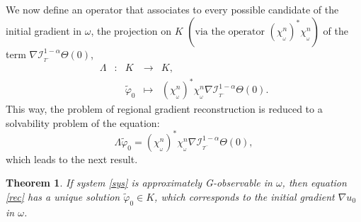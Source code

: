 \documentclass{article}
\newtheorem{theorem}{Theorem}
\begin{document}
We now define an operator that associates to every possible candidate 
of the initial gradient in $\omega$, the projection on $K$ 
$\left(\mbox{via the operator } (\chi_{_\omega}^{n})^*\chi_{_\omega}^{n}\right)$ 
of the term $\nabla\mathcal{I}_{_{T^-}}^{1-\alpha}\Theta(0)$,
\begin{equation}\label{lambda}
\begin{array}{lllll}
\Lambda & : & K & \longrightarrow & K, \\
&  & \tilde{\varphi}_0 & \longmapsto 
& (\chi_{_\omega}^{n})^*\chi_{_\omega}^{n}
\nabla\mathcal{I}_{_{T^-}}^{1-\alpha}\Theta(0).  
\end{array}
\end{equation}
This way, the problem of regional gradient reconstruction 
is reduced to a solvability problem of the equation:
\begin{equation}
\label{rec}
\Lambda \tilde{\varphi}_0 = (\chi_{_\omega}^{n})^*\chi_{_\omega}^{n}
\nabla\mathcal{I}_{_{T^-}}^{1-\alpha}\Theta(0),
\end{equation}
which leads to the next result.

\begin{theorem}
\label{th.main}
If system \eqref{sys} is approximately G-observable in $\omega$, 
then equation \eqref{rec} has a unique solution  
$\tilde{\varphi}_0\in K$, which corresponds 
to the initial gradient $\nabla u_0$ in $\omega$. 
\end{theorem}
\end{document}
